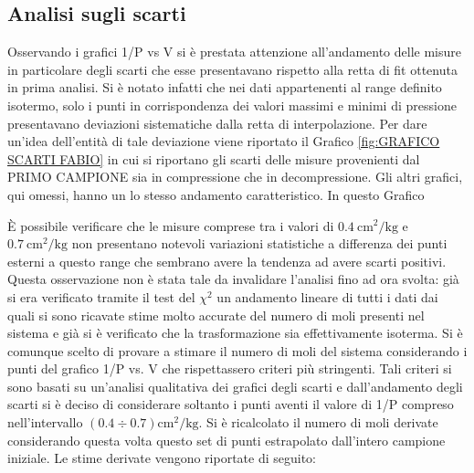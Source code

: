 \documentclass[a4paper,11pt,oneside]{article}
\begin{document}
\subsection{Analisi sugli scarti}
Osservando i grafici 1/P vs V si è prestata attenzione all'andamento delle misure in particolare degli scarti che esse presentavano rispetto alla retta di fit ottenuta in prima analisi. Si è notato infatti che nei dati appartenenti al range definito isotermo, solo i punti in corrispondenza dei valori massimi e minimi di pressione presentavano deviazioni sistematiche dalla retta di interpolazione. Per dare un'idea dell'entità di tale deviazione viene riportato il Grafico \ref{fig:GRAFICO SCARTI FABIO} in cui si riportano gli scarti delle misure provenienti dal PRIMO CAMPIONE sia in compressione che in decompressione. Gli altri grafici, qui omessi, hanno un lo stesso andamento caratteristico. In questo Grafico 



È possibile verificare che le misure comprese tra i valori di $\SI{0.4}{\centi\meter\squared\per\kilogram}$ e $\SI{0.7}{\centi\meter\squared\per\kilogram}$ non presentano notevoli variazioni statistiche a differenza dei punti esterni a questo range che sembrano avere la tendenza ad avere scarti positivi. Questa osservazione non è stata tale da invalidare l'analisi fino ad ora svolta: già si era verificato tramite il test del $\chi^{2}$ un andamento lineare di tutti i dati dai quali si sono ricavate stime molto accurate del numero di moli presenti nel sistema e già si è verificato che la trasformazione sia effettivamente isoterma. Si è comunque scelto di provare a stimare il numero di moli del sistema considerando i punti del grafico 1/P vs. V che rispettassero criteri più stringenti. Tali criteri si sono basati su un'analisi qualitativa dei grafici degli scarti e dall'andamento degli scarti si è deciso di considerare soltanto i punti aventi il valore di 1/P compreso nell'intervallo $(0.4 \div 0.7) \si{\centi\meter\squared\per\kilogram}$. Si è ricalcolato il numero di moli derivate considerando questa volta questo set di punti estrapolato dall'intero campione iniziale. Le stime derivate vengono riportate di seguito:
\end{document}
